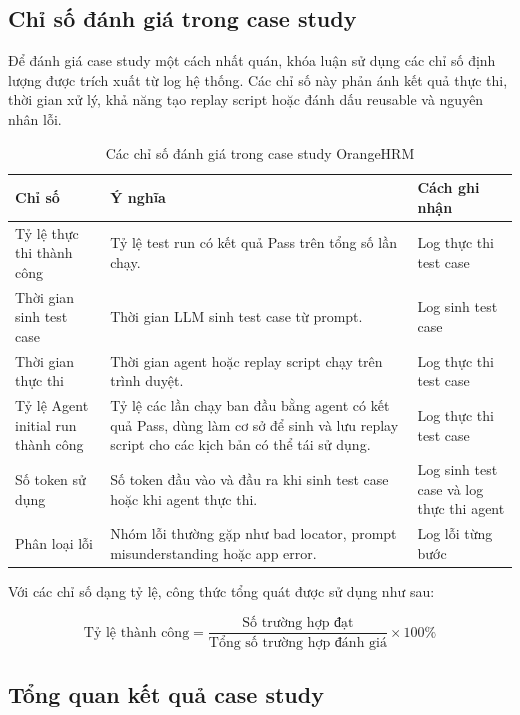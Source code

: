 \subsection{Chỉ số đánh giá trong case study}

Để đánh giá case study một cách nhất quán, khóa luận sử dụng các chỉ số định lượng được trích xuất từ log hệ thống. Các chỉ số này phản ánh kết quả thực thi, thời gian xử lý, khả năng tạo replay script hoặc đánh dấu reusable và nguyên nhân lỗi.

\begin{table}[H]
\centering
\caption{Các chỉ số đánh giá trong case study OrangeHRM}
\label{tab:chapter6_evaluation_metrics}
\renewcommand{\arraystretch}{1.2}
\begin{tabular}{|p{4.0cm}|p{7.2cm}|p{3.0cm}|}
\hline
\textbf{Chỉ số} & \textbf{Ý nghĩa} & \textbf{Cách ghi nhận} \\
\hline
Tỷ lệ thực thi thành công & Tỷ lệ test run có kết quả Pass trên tổng số lần chạy. & Log thực thi test case \\
\hline
Thời gian sinh test case & Thời gian LLM sinh test case từ prompt. & Log sinh test case \\
\hline
Thời gian thực thi & Thời gian agent hoặc replay script chạy trên trình duyệt. & Log thực thi test case \\
\hline
Tỷ lệ Agent initial run thành công & Tỷ lệ các lần chạy ban đầu bằng agent có kết quả Pass, dùng làm cơ sở để sinh và lưu replay script cho các kịch bản có thể tái sử dụng. & Log thực thi test case \\
\hline
Số token sử dụng & Số token đầu vào và đầu ra khi sinh test case hoặc khi agent thực thi. & Log sinh test case và log thực thi agent \\
\hline
Phân loại lỗi & Nhóm lỗi thường gặp như bad locator, prompt misunderstanding hoặc app error. & Log lỗi từng bước \\
\hline
\end{tabular}
\end{table}

Với các chỉ số dạng tỷ lệ, công thức tổng quát được sử dụng như sau:

\[
\text{Tỷ lệ thành công} = \frac{\text{Số trường hợp đạt}}{\text{Tổng số trường hợp đánh giá}} \times 100\%
\]

\subsection{Tổng quan kết quả case study}

